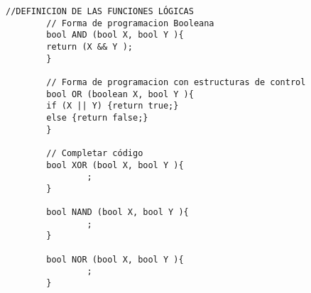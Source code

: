 {\begin{lstlisting}[language=Arduino,numbers=none, showstringspaces=false]
		//DEFINICION DE LAS FUNCIONES LÓGICAS
		// Forma de programacion Booleana
		bool AND (bool X, bool Y ){
		return (X && Y ); 
		}
		
		// Forma de programacion con estructuras de control
		bool OR (boolean X, bool Y ){
		if (X || Y) {return true;} 
		else {return false;}
		}
		
		// Completar código
		bool XOR (bool X, bool Y ){
				; 
		}
		
		bool NAND (bool X, bool Y ){
				; 
		}		
		
		bool NOR (bool X, bool Y ){
				; 
		}
		\end{lstlisting}
}